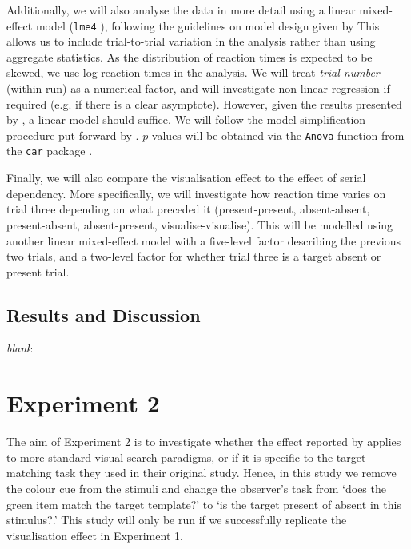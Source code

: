 \documentclass[smallextended]{svjour3}       %
\begin{document}
Additionally, we will also analyse the data in more detail using a linear mixed-effect model (\texttt{lme4} \citep{bates2015, R}), following the guidelines on model design given by \cite{barr2013} This allows us to include trial-to-trial variation in the analysis rather than using aggregate statistics. As the distribution of reaction times is expected to be skewed, we use log reaction times in the analysis. We will treat \textit{trial number} (within run) as a numerical factor, and will investigate non-linear regression if required (e.g. if there is a clear asymptote). However, given the results presented by \cite{reinhart2015}, a linear model should suffice. We will follow the model simplification procedure put forward by \cite[chapter 9]{crawley2012}. $p$-values will be obtained via the \texttt{Anova} function from the \texttt{car} package \citep{fox2011}.

Finally, we will also compare the visualisation effect to the effect of serial dependency. More specifically, we will investigate how reaction time varies on trial three depending on what preceded it (present-present, absent-absent, present-absent, absent-present, visualise-visualise). This will be modelled using another linear mixed-effect model with a five-level factor describing the previous two trials, and a two-level factor for whether trial three is a target absent or present trial.

\subsection{Results and Discussion}


\centering
\textit{blank}

\section{Experiment 2}
\label{sec:exp2}

The aim of Experiment 2 is to investigate whether the effect reported by \cite{reinhart2015} applies to more standard visual search paradigms, or if it is specific to the target matching task they used in their original study. Hence, in this study we remove the colour cue from the stimuli and change the observer's task from `does the green item match the target template?' to `is the target present of absent in this stimulus?.' This study will only be run if we successfully replicate the visualisation effect in Experiment 1. 
\end{document}
